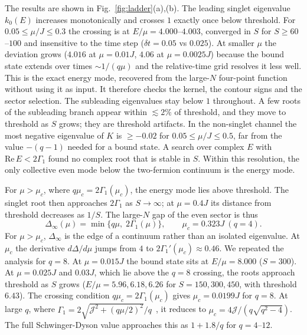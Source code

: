 \documentclass[aps,pre,twocolumn,superscriptaddress,amsmath,amssymb,10pt]{revtex4-2}
\newcommand{\J}{\mathcal{J}}
\begin{document}
The results are shown in Fig.~\ref{fig:ladder}(a),(b). The leading singlet eigenvalue $k_0(E)$ increases monotonically and crosses $1$ exactly once below threshold. For $0.05\le\mu/J\le0.3$ the crossing is at $E/\mu=4.000$--$4.003$, converged in $S$ for $S\ge60$--$100$ and insensitive to the time step ($\delta t=0.05$ vs $0.025$). At smaller $\mu$ the deviation grows ($4.016$ at $\mu=0.01J$, $4.06$ at $\mu=0.0025J$) because the bound state extends over times $\sim1/(q\mu)$ and the relative-time grid resolves it less well. This is the exact energy mode, recovered from the large-$N$ four-point function without using it as input. It therefore checks the kernel, the contour signs and the sector selection. The subleading eigenvalues stay below $1$ throughout. A few roots of the subleading branch appear within $\lesssim2\%$ of threshold, and they move to threshold as $S$ grows; they are threshold artifacts. In the non-singlet channel the most negative eigenvalue of $K$ is $\ge-0.02$ for $0.05\le\mu/J\le0.5$, far from the value $-(q-1)$ needed for a bound state. A search over complex $E$ with $\mathrm{Re}\,E<2\Gamma_1$ found no complex root that is stable in $S$. Within this resolution, the only collective even mode below the two-fermion continuum is the energy mode.

For $\mu>\mu_c$, where $q\mu_c=2\Gamma_1(\mu_c)$, the energy mode lies above threshold. The singlet root then approaches $2\Gamma_1$ as $S\to\infty$; at $\mu=0.4J$ its distance from threshold decreases as $1/S$. The large-$N$ gap of the even sector is thus
\begin{equation}
\Delta_\infty(\mu)=\min\{q\mu,\;2\Gamma_1(\mu)\},\qquad \mu_c=0.323J\ (q=4).
\label{eq:Delta}
\end{equation}
For $\mu>\mu_c$, $\Delta_\infty$ is the edge of a continuum rather than an isolated eigenvalue. At $\mu_c$ the derivative $d\Delta/d\mu$ jumps from $4$ to $2\Gamma_1'(\mu_c)\approx0.46$. We repeated the analysis for $q=8$. At $\mu=0.015J$ the bound state sits at $E/\mu=8.000$ ($S=300$). At $\mu=0.025J$ and $0.03J$, which lie above the $q=8$ crossing, the roots approach threshold as $S$ grows ($E/\mu=5.96,6.18,6.26$ for $S=150,300,450$, with threshold $6.43$). The crossing condition $q\mu_c=2\Gamma_1(\mu_c)$ gives $\mu_c=0.0199J$ for $q=8$. At large $q$, where $\Gamma_1=2\sqrt{\J^2+(q\mu/2)^2}/q$~\cite{Kulkarni2022}, it reduces to $\mu_c=4\J/(q\sqrt{q^2-4})$. The full Schwinger-Dyson value approaches this as $1+1.8/q$ for $q=4$--$12$.
\end{document}
